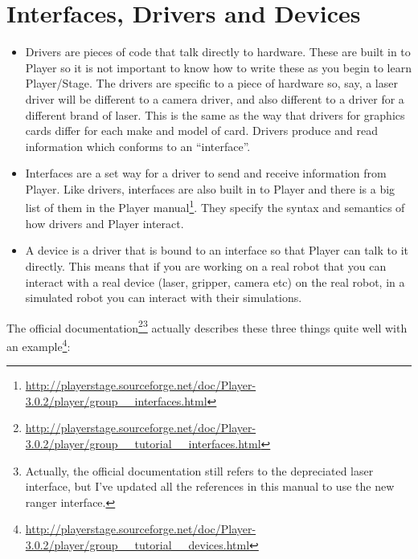 \documentclass[a4paper]{report}
\newcommand{\plst}{Player/Stage\xspace}
\newcommand{\pl}{Player\xspace}
\begin{document}
\section{Interfaces, Drivers and Devices} \label{sec:Basics:InterfaceDriverDevices}
\begin{itemize}
\item Drivers are pieces of code that talk directly to hardware. These are built in to \pl so it is not important to know how to write these as you begin to learn \plst. The drivers are specific to a piece of hardware so, say, a laser driver will be different to a camera driver, and also different to a driver for a different brand of laser. This is the same as the way that drivers for graphics cards differ for each make and model of card. Drivers produce and read information which conforms to an ``interface''.

\item Interfaces are a set way for a driver to send and receive information from \pl. Like drivers, interfaces are also built in to \pl and there is a big list of them in the \pl manual\footnote{\url{http://playerstage.sourceforge.net/doc/Player-3.0.2/player/group__interfaces.html}}. They specify the syntax and semantics of how drivers and \pl interact.
	
\item A device is a driver that is bound to an interface so that \pl can talk to it directly. This means that if you are working on a real robot that you can interact with a real device (laser, gripper, camera etc) on the real robot, in a simulated robot you can interact with their simulations. 
\end{itemize}

The official documentation\footnote{\url{http://playerstage.sourceforge.net/doc/Player-3.0.2/player/group__tutorial__interfaces.html}}\footnote{Actually, the official documentation still refers to the depreciated laser interface, but I've updated all the references in this manual to use the new ranger interface.} actually describes these three things quite well with an example\footnote{\url{http://playerstage.sourceforge.net/doc/Player-3.0.2/player/group__tutorial__devices.html}}:
\end{document}
